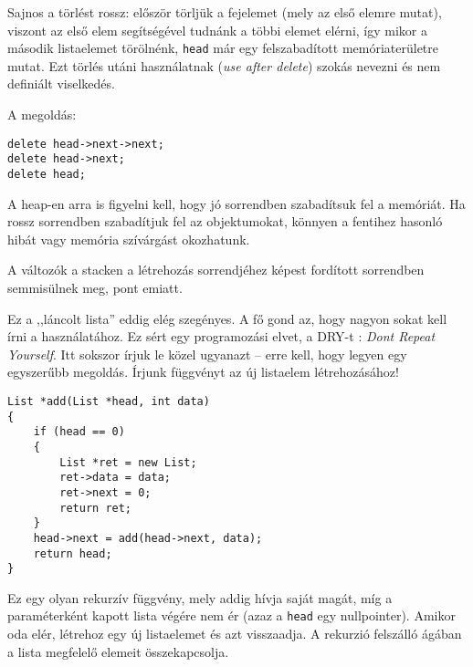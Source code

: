 \documentclass[a4paper,11.5pt,table]{article}
\begin{document}
	\begin{figure}[!h]
		\centering
	\end{figure}
	Sajnos a törlést rossz: először törljük a fejelemet (mely az első elemre mutat), viszont az első elem segítségével tudnánk a többi elemet elérni, így mikor a második listaelemet törölnénk, \texttt{head} már egy felszabadított memóriaterületre mutat. Ezt törlés utáni használatnak (\textit{use after delete}) szokás nevezni és nem definiált viselkedés.
	
	A megoldás:
	\begin{lstlisting}
delete head->next->next;
delete head->next;
delete head;
	\end{lstlisting}
	\begin{note}
		A heap-en arra is figyelni kell, hogy jó sorrendben szabadítsuk fel a memóriát. Ha rossz sorrendben szabadítjuk fel az objektumokat, könnyen a fentihez hasonló hibát vagy memória szívárgást okozhatunk.
	\end{note}
	A változók a stacken a létrehozás sorrendjéhez képest fordított sorrendben semmisülnek meg, pont emiatt.
	\medskip
	
	Ez a ,,láncolt lista'' eddig elég szegényes. A fő gond az, hogy nagyon sokat kell írni a használatához. Ez sért egy programozási elvet, a DRY-t : \textit{Dont Repeat Yourself}. Itt sokszor írjuk le közel ugyanazt -- erre kell, hogy legyen egy egyszerűbb megoldás. Írjunk függvényt az új listaelem létrehozásához!
	\begin{lstlisting}
List *add(List *head, int data)
{
	if (head == 0)
	{
		List *ret = new List;
		ret->data = data;
		ret->next = 0;
		return ret;
	}
	head->next = add(head->next, data);
	return head;
}
	\end{lstlisting}
	Ez egy olyan rekurzív függvény, mely addig hívja saját magát, míg a paraméterként kapott lista végére nem ér (azaz a \texttt{head} egy nullpointer). Amikor oda elér, létrehoz egy új listaelemet és azt visszaadja. A rekurzió felszálló ágában a lista megfelelő elemeit összekapcsolja. 
	\medskip
	
\end{document}

